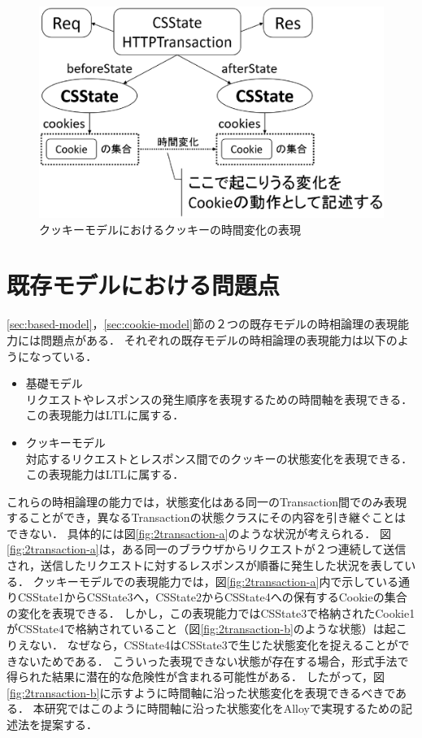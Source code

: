 \documentclass[12pt,a4paper]{jbook}
\begin{document}
\begin{figure}[htb]
\centering
\includegraphics[width=350pt]{./fig/cookie-model-transaction.eps}
\caption{クッキーモデルにおけるクッキーの時間変化の表現}
\label{fig:cookie-model-transaction}
\end{figure}

\section{既存モデルにおける問題点}
\label{sec:existing-models-problems}
\ref{sec:based-model}，\ref{sec:cookie-model}節の２つの既存モデルの時相論理の表現能力には問題点がある．
それぞれの既存モデルの時相論理の表現能力は以下のようになっている．
\begin{itemize}
\item 基礎モデル \\
リクエストやレスポンスの発生順序を表現するための時間軸を表現できる．
この表現能力はLTLに属する．
\item クッキーモデル \\
対応するリクエストとレスポンス間でのクッキーの状態変化を表現できる．
この表現能力はLTLに属する．
\end{itemize}
これらの時相論理の能力では，状態変化はある同一のTransaction間でのみ表現することができ，異なるTransactionの状態クラスにその内容を引き継ぐことはできない．
具体的には図\ref{fig:2transaction-a}のような状況が考えられる．
図\ref{fig:2transaction-a}は，ある同一のブラウザからリクエストが２つ連続して送信され，送信したリクエストに対するレスポンスが順番に発生した状況を表している．
クッキーモデルでの表現能力では，図\ref{fig:2transaction-a}内で示している通りCSState1からCSState3へ，CSState2からCSState4への保有するCookieの集合の変化を表現できる．
しかし，この表現能力ではCSState3で格納されたCookie1がCSState4で格納されていること（図\ref{fig:2transaction-b}のような状態）は起こりえない．
なぜなら，CSState4はCSState3で生じた状態変化を捉えることができないためである．
こういった表現できない状態が存在する場合，形式手法で得られた結果に潜在的な危険性が含まれる可能性がある．
したがって，図\ref{fig:2transaction-b}に示すように時間軸に沿った状態変化を表現できるべきである．
本研究ではこのように時間軸に沿った状態変化をAlloyで実現するための記述法を提案する．
\end{document}
